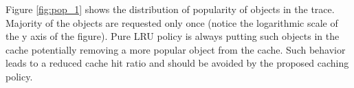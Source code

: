 Figure \ref{fig:pop_1} shows the distribution of popularity of objects in the trace. Majority of the objects are requested only once (notice the logarithmic scale of the y axis of the figure). Pure LRU policy is always putting such objects in the cache potentially removing a more popular object from the cache. Such behavior leads to a reduced cache hit ratio and should be avoided by the proposed caching policy.